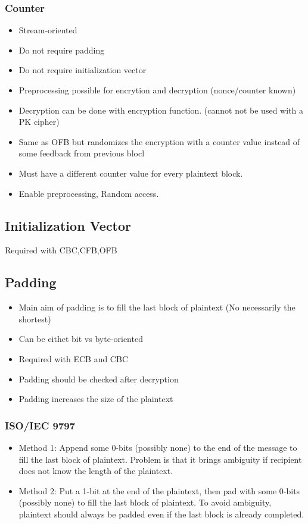 \subsubsection{Counter}

\begin{itemize}
    \item Stream-oriented
    \item Do not require padding
    \item Do not require initialization vector
    \item Preprocessing possible for encrytion and decryption
    (nonce/counter known)
    \item Decryption can be done with encryption function. (cannot not be used
    with a PK cipher)
    \item Same as OFB but randomizes the encryption with a counter value instead
    of some feedback from previous blocl
    \item Must have a different counter value for every plaintext block.
    \item Enable preprocessing, Random access.
\end{itemize}

\subsection{Initialization Vector}
Required with CBC,CFB,OFB %

\subsection{Padding}
\begin{itemize}
    \item Main aim of padding is to fill the last block of plaintext (No
    necessarily the shortest)
    \item Can be eithet bit vs byte-oriented
    \item Required with ECB and CBC
    \item Padding should be checked after decryption
    \item Padding increases the size of the plaintext
\end{itemize}

\subsubsection{ISO/IEC 9797}
\begin{itemize}
    \item Method 1: Append some 0-bits (possibly none) to the end of the message
    to fill the last block of plaintext. Problem is that it brings ambiguity if
    recipient does not know the length of the plaintext.

    \item Method 2: Put a 1-bit at the end of the plaintext, then pad with
    some 0-bits (possibly none) to fill the last block of plaintext. To avoid
    ambiguity, plaintext should always be padded even if the last block is
    already completed.
\end{itemize}

